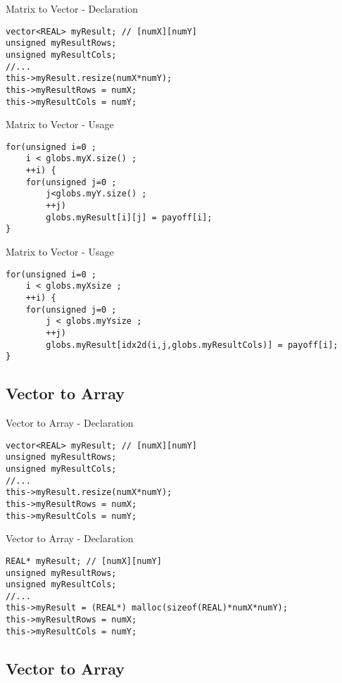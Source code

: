 \documentclass[xcolor=x11names,compress]{beamer}
\begin{document}
\begin{frame}[fragile]{Matrix to Vector - Declaration}
\begin{verbatim}
vector<REAL> myResult; // [numX][numY]
unsigned myResultRows;
unsigned myResultCols;
//...
this->myResult.resize(numX*numY);
this->myResultRows = numX;
this->myResultCols = numY;
\end{verbatim}
\end{frame}

\begin{frame}[fragile]{Matrix to Vector - Usage}
\begin{verbatim}
for(unsigned i=0 ;
    i < globs.myX.size() ;
    ++i) {
    for(unsigned j=0 ;
        j<globs.myY.size() ;
        ++j) 
        globs.myResult[i][j] = payoff[i];
}
\end{verbatim}
\end{frame}

\begin{frame}[fragile]{Matrix to Vector - Usage}
\begin{verbatim}
for(unsigned i=0 ;
    i < globs.myXsize ;
    ++i) {
    for(unsigned j=0 ;
        j < globs.myYsize ;
        ++j) 
        globs.myResult[idx2d(i,j,globs.myResultCols)] = payoff[i];
}
\end{verbatim}
\end{frame}


\subsection{Vector to Array}
\begin{frame}[fragile]{Vector to Array - Declaration}
\begin{verbatim}
vector<REAL> myResult; // [numX][numY]
unsigned myResultRows;
unsigned myResultCols;
//...
this->myResult.resize(numX*numY);
this->myResultRows = numX;
this->myResultCols = numY;
\end{verbatim}
\end{frame}

\begin{frame}[fragile]{Vector to Array - Declaration}
\begin{verbatim}
REAL* myResult; // [numX][numY]
unsigned myResultRows;
unsigned myResultCols;
//...
this->myResult = (REAL*) malloc(sizeof(REAL)*numX*numY);
this->myResultRows = numX;
this->myResultCols = numY;
\end{verbatim}
\end{frame}

\subsection{Vector to Array}
\end{document}
